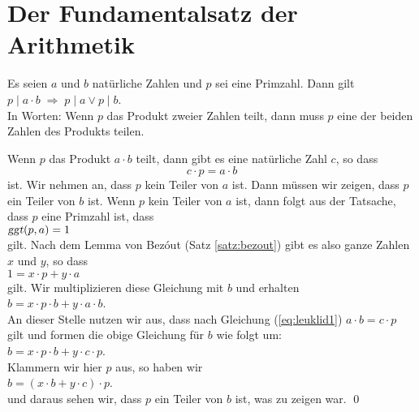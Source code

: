 \section{Der Fundamentalsatz der Arithmetik}
\begin{Satz} \lb
Es seien $a$ und $b$ nat\"{u}rliche Zahlen und $p$ sei eine Primzahl.  Dann gilt
\\[0.2cm]
\hspace*{1.3cm}
$p \mid a \cdot b \;\Rightarrow\; p \mid a  \vee p \mid b$.
\\[0.2cm]
In Worten: Wenn $p$ das Produkt zweier Zahlen teilt, dann muss $p$ eine der beiden Zahlen
des Produkts teilen.  
\end{Satz}

\proof
Wenn $p$ das Produkt $a \cdot b$ teilt, dann gibt es eine nat\"{u}rliche Zahl $c$, so dass
\begin{equation}
  \label{eq:leuklid1}
  c \cdot p = a \cdot b
\end{equation}
ist.  Wir nehmen an, dass $p$ kein Teiler von $a$ ist.  Dann m\"{u}ssen wir zeigen, dass $p$ ein
Teiler von $b$ ist.  Wenn $p$ kein Teiler von $a$ ist, dann folgt aus der Tatsache, dass
$p$ eine Primzahl ist, dass
\\[0.2cm]
\hspace*{1.3cm}
$\textsl{ggt}(p, a) = 1$
\\[0.2cm]
gilt.  Nach dem Lemma von Bez\'out (Satz \ref{satz:bezout}) gibt es also ganze Zahlen $x$
und $y$, so dass 
\\[0.2cm]
\hspace*{1.3cm}
$1 = x \cdot p + y \cdot a$
\\[0.2cm]
gilt.  Wir multiplizieren diese Gleichung mit $b$ und erhalten
\\[0.2cm]
\hspace*{1.3cm}
$b = x \cdot p \cdot b + y \cdot a \cdot b$.
\\[0.2cm]
An dieser Stelle nutzen wir aus, dass nach Gleichung (\ref{eq:leuklid1}) 
$a \cdot b = c \cdot p$ gilt und formen die obige Gleichung f\"{u}r $b$ wie folgt um:
\\[0.2cm]
\hspace*{1.3cm}
$b = x \cdot p \cdot b + y \cdot c \cdot p$.
\\[0.2cm]
Klammern wir hier $p$ aus, so haben wir
\\[0.2cm]
\hspace*{1.3cm}
$b = (x \cdot b + y \cdot c) \cdot p$.
\\[0.2cm]
und daraus sehen wir, dass $p$ ein Teiler von $b$ ist, was zu zeigen war. \qed
\vspace*{0.3cm}

